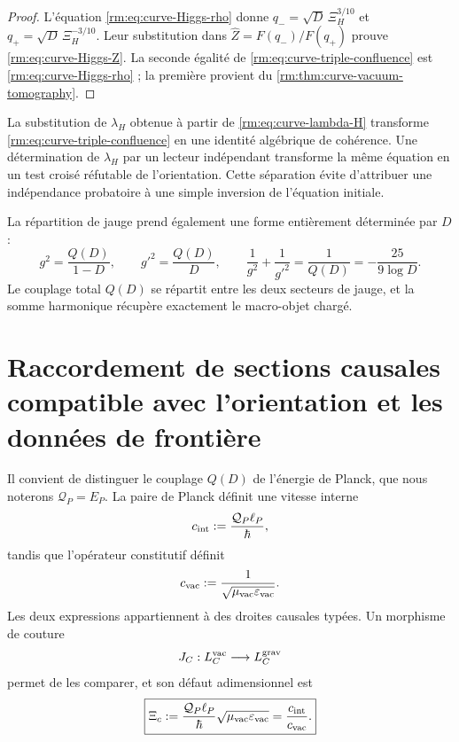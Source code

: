 \begin{proof}
L’équation \cref{rm:eq:curve-Higgs-rho} donne \(q_-=\sqrt D\,\Xi_H^{3/10}\) et \(q_+=\sqrt D\,\Xi_H^{-3/10}\). Leur substitution dans \(\widehat Z=F(q_-)/F(q_+)\) prouve \cref{rm:eq:curve-Higgs-Z}. La seconde égalité de \cref{rm:eq:curve-triple-confluence} est \cref{rm:eq:curve-Higgs-rho} ; la première provient du \cref{rm:thm:curve-vacuum-tomography}.
\end{proof}

La substitution de \(\lambda_H\) obtenue à partir de \cref{rm:eq:curve-lambda-H} transforme \cref{rm:eq:curve-triple-confluence} en une identité algébrique de cohérence. Une détermination de \(\lambda_H\) par un lecteur indépendant transforme la même équation en un test croisé réfutable de l’orientation. Cette séparation évite d’attribuer une indépendance probatoire à une simple inversion de l’équation initiale.

La répartition de jauge prend également une forme entièrement déterminée par \(D\) :
\begin{equation}
 g^2=\frac{Q(D)}{1-D},
 \qquad
 g'^2=\frac{Q(D)}D,
 \qquad
 \boxed{
 \frac1{g^2}+\frac1{g'^2}=\frac1{Q(D)}
 =-\frac{25}{9\log D}.}
 \label{rm:eq:curve-gauge-harmonic}
\end{equation}
Le couplage total \(Q(D)\) se répartit entre les deux secteurs de jauge, et la somme harmonique récupère exactement le macro-objet chargé.

\section{Raccordement de sections causales compatible avec l’orientation et les données de frontière}

Il convient de distinguer le couplage \(Q(D)\) de l’énergie de Planck, que nous noterons \(\mathcal Q_P=E_P\). La paire de Planck définit une vitesse interne
\begin{equation}
 c_{\rm int}:=\frac{\mathcal Q_P\ell_P}{\hbar},
 \label{rm:eq:curve-c-int}
\end{equation}
tandis que l’opérateur constitutif définit
\begin{equation}
 c_{\rm vac}:=\frac1{\sqrt{\mu_{\rm vac}\varepsilon_{\rm vac}}}.
 \label{rm:eq:curve-c-vac}
\end{equation}
Les deux expressions appartiennent à des droites causales typées. Un morphisme de couture
\begin{equation}
 J_C:L_C^{\rm vac}\longrightarrow L_C^{\rm grav}
 \label{rm:eq:curve-JC}
\end{equation}
permet de les comparer, et son défaut adimensionnel est
\begin{equation}
 \boxed{
 \Xi_c
 :=\frac{\mathcal Q_P\ell_P}{\hbar}
   \sqrt{\mu_{\rm vac}\varepsilon_{\rm vac}}
 =\frac{c_{\rm int}}{c_{\rm vac}}.}
 \label{rm:eq:curve-Xi-c}
\end{equation}

